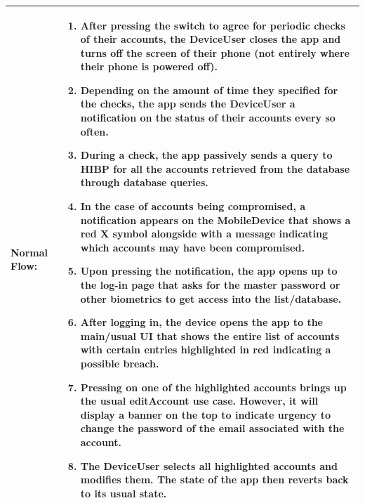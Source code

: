 \documentclass[stu]{apa7}
\begin{document}
{\begin{xltabular}{\textwidth}{|l|X|}
  Normal Flow: &
                 \begin{enumerate}
                   \item After pressing the switch to agree for periodic checks of their accounts, the DeviceUser closes the app and turns off the screen of their phone (not entirely where their phone is powered off).
                   \item Depending on the amount of time they specified for the checks, the app sends the DeviceUser a notification on the status of their accounts every so often.
                   \item During a check, the app passively sends a query to HIBP for all the accounts retrieved from the database through database queries.
                   \item In the case of accounts being compromised, a notification appears on the MobileDevice that shows a red X symbol alongside with a message indicating which accounts may have been compromised.
                   \item Upon pressing the notification, the app opens up to the log-in page that asks for the master password or other biometrics to get access into the list/database.
                   \item After logging in, the device opens the app to the main/usual UI that shows the entire list of accounts  with certain entries highlighted in red indicating a possible breach.
                   \item Pressing on one of the highlighted accounts brings up the usual editAccount use case. However,  it will display a banner on the top to indicate urgency to change the password of the email associated with the account.
                   \item The DeviceUser selects all highlighted accounts and modifies them. The state of the app then reverts back to its usual state.
                \end{enumerate} \\ \hline


\end{xltabular}}
\end{document}
